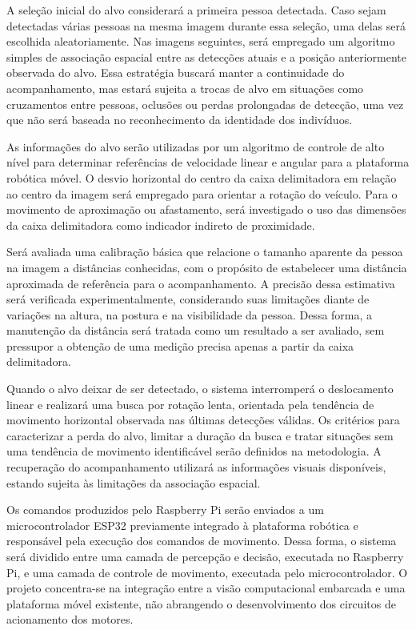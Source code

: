 A seleção inicial do alvo considerará a primeira pessoa detectada. Caso sejam detectadas várias pessoas na mesma imagem durante essa seleção, uma delas será escolhida aleatoriamente. Nas imagens seguintes, será empregado um algoritmo simples de associação espacial entre as detecções atuais e a posição anteriormente observada do alvo. Essa estratégia buscará manter a continuidade do acompanhamento, mas estará sujeita a trocas de alvo em situações como cruzamentos entre pessoas, oclusões ou perdas prolongadas de detecção, uma vez que não será baseada no reconhecimento da identidade dos indivíduos.

As informações do alvo serão utilizadas por um algoritmo de controle de alto nível para determinar referências de velocidade linear e angular para a plataforma robótica móvel. O desvio horizontal do centro da caixa delimitadora em relação ao centro da imagem será empregado para orientar a rotação do veículo. Para o movimento de aproximação ou afastamento, será investigado o uso das dimensões da caixa delimitadora como indicador indireto de proximidade.

Será avaliada uma calibração básica que relacione o tamanho aparente da pessoa na imagem a distâncias conhecidas, com o propósito de estabelecer uma distância aproximada de referência para o acompanhamento. A precisão dessa estimativa será verificada experimentalmente, considerando suas limitações diante de variações na altura, na postura e na visibilidade da pessoa. Dessa forma, a manutenção da distância será tratada como um resultado a ser avaliado, sem pressupor a obtenção de uma medição precisa apenas a partir da caixa delimitadora.

Quando o alvo deixar de ser detectado, o sistema interromperá o deslocamento linear e realizará uma busca por rotação lenta, orientada pela tendência de movimento horizontal observada nas últimas detecções válidas. Os critérios para caracterizar a perda do alvo, limitar a duração da busca e tratar situações sem uma tendência de movimento identificável serão definidos na metodologia. A recuperação do acompanhamento utilizará as informações visuais disponíveis, estando sujeita às limitações da associação espacial.

Os comandos produzidos pelo Raspberry Pi serão enviados a um microcontrolador ESP32 previamente integrado à plataforma robótica e responsável pela execução dos comandos de movimento. Dessa forma, o sistema será dividido entre uma camada de percepção e decisão, executada no Raspberry Pi, e uma camada de controle de movimento, executada pelo microcontrolador. O projeto concentra-se na integração entre a visão computacional embarcada e uma plataforma móvel existente, não abrangendo o desenvolvimento dos circuitos de acionamento dos motores.

